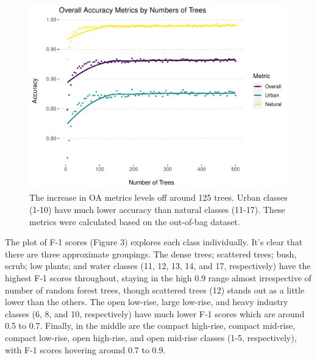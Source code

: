 \documentclass[
]{article}
\begin{document}
\begin{figure}[H]

{\centering \includegraphics[width=0.75\linewidth]{../results/plots/ntree_5_to_500_line_plot} 

}

\caption{The increase in OA metrics levels off around 125 trees. Urban classes (1-10) have much lower accuracy than natural classes (11-17). These metrics were calculated based on the out-of-bag dataset.}\label{fig:image-ref-for-in-text1}
\end{figure}

The plot of F-1 scores (Figure 3) explores each class individually. It's
clear that there are three approximate groupings. The dense trees;
scattered trees; bush, scrub; low plants; and water classes (11, 12, 13,
14, and 17, respectively) have the highest F-1 scores throughout,
staying in the high 0.9 range almost irrespective of number of random
forest trees, though scattered trees (12) stands out as a little lower
than the others. The open low-rise, large low-rise, and heavy industry
classes (6, 8, and 10, respectively) have much lower F-1 scores which
are around 0.5 to 0.7. Finally, in the middle are the compact high-rise,
compact mid-rise, compact low-rise, open high-rise, and open mid-rise
classes (1-5, respectively), with F-1 scores hovering around 0.7 to 0.9.
\end{document}
